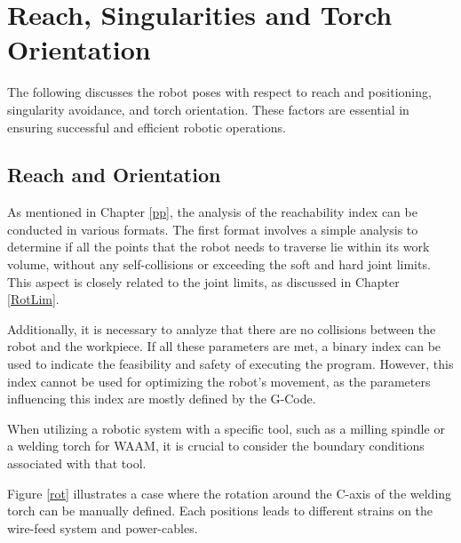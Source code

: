 \section{Reach, Singularities and Torch Orientation}
The following discusses the robot poses with respect to reach and positioning, singularity avoidance, and torch orientation. These factors are essential in ensuring successful and efficient robotic operations.

\subsection{Reach and Orientation}\label{RO}

As mentioned in Chapter \ref{pp}, the analysis of the reachability index can be conducted in various formats. The first format involves a simple analysis to determine if all the points that the robot needs to traverse lie within its work volume, without any self-collisions or exceeding the soft and hard joint limits. This aspect is closely related to the joint limits, as discussed in Chapter \ref{RotLim}. 

Additionally, it is necessary to analyze that there are no collisions between the robot and the workpiece. If all these parameters are met, a binary index can be used to indicate the feasibility and safety of executing the program. However, this index cannot be used for optimizing the robot's movement, as the parameters influencing this index are mostly defined by the G-Code.

When utilizing a robotic system with a specific tool, such as a milling spindle or a welding torch for WAAM, it is crucial to consider the boundary conditions associated with that tool. 




Figure \ref{rot} illustrates a case where the rotation around the C-axis of the welding torch can be manually defined. Each positions leads to different strains on the wire-feed system and power-cables.

